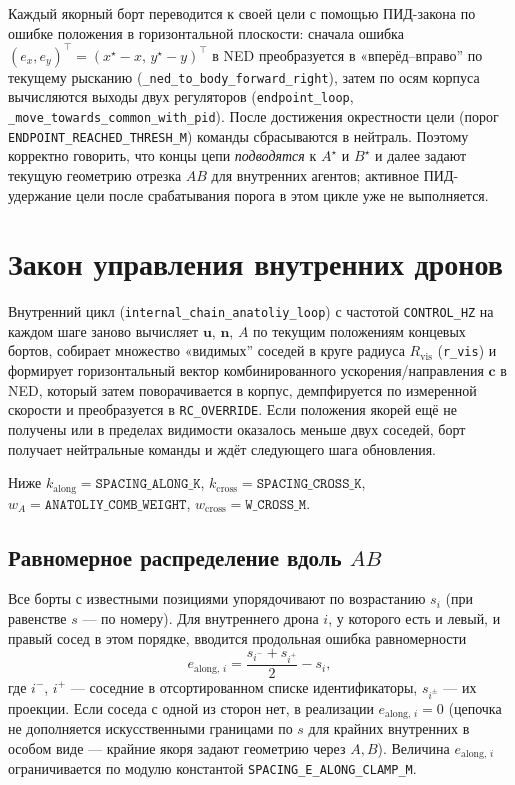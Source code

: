 \documentclass[12pt,a4paper]{article}
\begin{document}
Каждый якорный борт переводится к своей цели с помощью ПИД-закона по ошибке положения в горизонтальной плоскости: сначала ошибка $(e_x, e_y)^\top = (x^\star - x,\, y^\star - y)^\top$ в NED преобразуется в «вперёд--вправо'' по текущему рысканию (\texttt{\_ned\_to\_body\_forward\_right}), затем по осям корпуса вычисляются выходы двух регуляторов (\texttt{endpoint\_loop}, \texttt{\_move\_towards\_common\_with\_pid}). После достижения окрестности цели (порог \texttt{ENDPOINT\_REACHED\_THRESH\_M}) команды сбрасываются в нейтраль. Поэтому корректно говорить, что концы цепи \emph{подводятся} к $A^\star$ и $B^\star$ и далее задают текущую геометрию отрезка $AB$ для внутренних агентов; активное ПИД-удержание цели после срабатывания порога в этом цикле уже не выполняется.

\section{Закон управления внутренних дронов}

Внутренний цикл (\texttt{internal\_chain\_anatoliy\_loop}) с частотой \texttt{CONTROL\_HZ} на каждом шаге заново вычисляет $\mathbf{u}$, $\mathbf{n}$, $A$ по текущим положениям концевых бортов, собирает множество «видимых'' соседей в круге радиуса $R_{\mathrm{vis}}$ (\texttt{r\_vis}) и формирует горизонтальный вектор комбинированного ускорения/направления $\mathbf{c}$ в NED, который затем поворачивается в корпус, демпфируется по измеренной скорости и преобразуется в \texttt{RC\_OVERRIDE}. Если положения якорей ещё не получены или в пределах видимости оказалось меньше двух соседей, борт получает нейтральные команды и ждёт следующего шага обновления.

Ниже $k_{\mathrm{along}} = \texttt{SPACING\_ALONG\_K}$, $k_{\mathrm{cross}} = \texttt{SPACING\_CROSS\_K}$, $w_A = \texttt{ANATOLIY\_COMB\_WEIGHT}$, $w_{\mathrm{cross}} = \texttt{W\_CROSS\_M}$.

\subsection{Равномерное распределение вдоль $AB$}

Все борты с известными позициями упорядочивают по возрастанию $s_i$ (при равенстве $s$ --- по номеру). Для внутреннего дрона $i$, у которого есть и левый, и правый сосед в этом порядке, вводится продольная ошибка равномерности
\begin{equation}
  e_{\mathrm{along},\,i} = \frac{s_{i^-} + s_{i^+}}{2} - s_i,
\end{equation}
где $i^-$, $i^+$ --- соседние в отсортированном списке идентификаторы, $s_{i^\pm}$ --- их проекции. Если соседа с одной из сторон нет, в реализации $e_{\mathrm{along},\,i} = 0$ (цепочка не дополняется искусственными границами по $s$ для крайних внутренних в особом виде --- крайние якоря задают геометрию через $A,B$). Величина $e_{\mathrm{along},\,i}$ ограничивается по модулю константой \texttt{SPACING\_E\_ALONG\_CLAMP\_M}.
\end{document}

